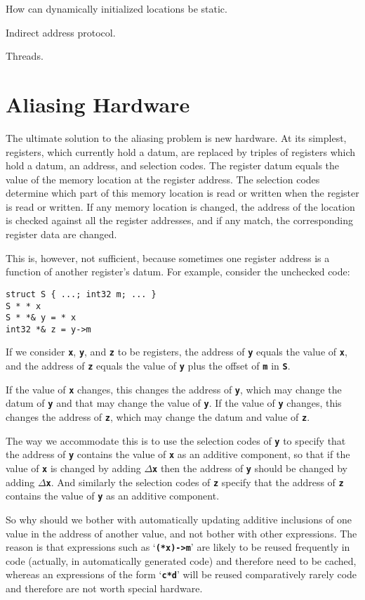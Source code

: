 \documentclass[12pt]{article}
\newcommand{\TT}[1]{{\tt \bfseries #1}}
\newenvironment{indpar}[1][0.3in]%
	{\begin{list}{}%
		     {\setlength{\itemsep}{0in}%
		      \setlength{\topsep}{0in}%
		      \setlength{\parsep}{1ex}%
		      \setlength{\labelwidth}{#1}%
		      \setlength{\leftmargin}{#1}%
		      \addtolength{\leftmargin}{\labelsep}}%
	 \item}%
	{\end{list}}
\begin{document}
How can dynamically initialized locations be static.

Indirect address protocol.
\label{INDIRECT-ADDRESS-PROTOCOL}

Threads.
\label{THREADS}

\appendix

\section{Aliasing Hardware}
\label{ALIASING-HARDWARE}

The ultimate solution to the aliasing problem is new hardware.
At its simplest, registers, which currently hold a datum,
are replaced by triples of registers which hold a datum,
an address, and selection codes.  The register datum equals the value
of the memory location at the register address.  The selection
codes determine which part of this memory location is read or written
when the register is read or written.  If any memory location is
changed, the address of the location is checked against all the
register addresses, and if any match, the corresponding register
data are changed.

This is, however, not sufficient, because sometimes one register
address is a function of another register's datum.  For example,
consider the unchecked code:
\begin{indpar}[0.5em]\begin{verbatim}
struct S { ...; int32 m; ... }
S * * x
S * *& y = * x
int32 *& z = y->m
\end{verbatim}\end{indpar}
If we consider \TT{x}, \TT{y}, and \TT{z} to be registers,
the address of \TT{y} equals the value of \TT{x}, and the
address of \TT{z} equals the value of \TT{y} plus the offset of
\TT{m} in \TT{S}.

If the value of \TT{x} changes, this changes the address of \TT{y},
which may change the datum of \TT{y} and that may change the value
of \TT{y}.  If the value of \TT{y} changes, this changes the address
of \TT{z}, which may change the datum and value of \TT{z}.

The way we accommodate this is to use the selection codes of \TT{y}
to specify that the address of \TT{y} contains the value of \TT{x}
as an additive component, so
that if the value of \TT{x} is changed by adding $\Delta$\TT{x}
then the address of \TT{y} should be changed by adding $\Delta$\TT{x}.
And similarly the selection codes
of \TT{z} specify that the address of \TT{z}
contains the value of \TT{y} as an additive component.

So why should we bother with automatically updating
additive inclusions of one value in the
address of another value, and not bother with other expressions.
The reason is that expressions such as
`\TT{(*x)->m}' are likely to be reused frequently in code (actually,
in automatically generated code) and
therefore need to be cached, whereas an expressions of the form
`\TT{c*d}' will be reused comparatively rarely code
and therefore are not worth special hardware.





\printindex
\end{document}

